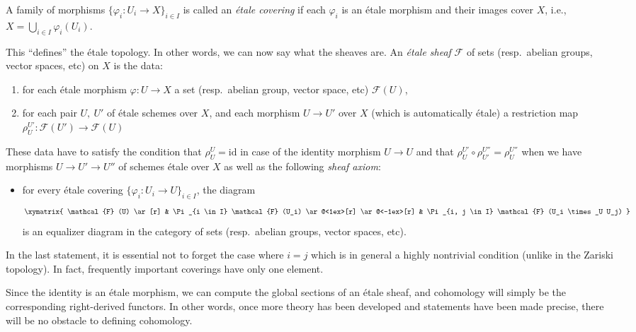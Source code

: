\begin{definition}
\label{definition-etale-covering-initial}
A family of morphisms $\{ \varphi_i : U_i \to X\}_{i \in I}$ is
called an {\it \'etale covering} if each $\varphi_i$ is an \'etale morphism
and their images cover $X$, i.e.,
$X = \bigcup_{i \in I} \varphi_i(U_i)$.
\end{definition}

\noindent
This ``defines'' the \'etale topology. In other words, we can now say what the
sheaves are. An {\it \'etale sheaf} $\mathcal{F}$ of sets
(resp.\ abelian groups, vector spaces, etc) on $X$ is the data:
\begin{enumerate}
\item for each \'etale morphism $\varphi : U \to X$ a set
(resp.\ abelian group, vector space, etc) $\mathcal{F}(U)$,
\item for each pair $U, \ U'$ of \'etale schemes over $X$,
and each morphism $U \to U'$ over $X$ (which is
automatically \'etale) a restriction map
$\rho^{U'}_U : \mathcal{F}(U') \to \mathcal{F}(U)$
\end{enumerate}
These data have to satisfy the condition that $\rho^U_U = \text{id}$
in case of the identity morphism $U \to U$
and that $\rho^{U'}_U \circ \rho^{U''}_{U'} = \rho^{U''}_U$
when we have morphisms $U \to U' \to U''$ of schemes \'etale over $X$
as well as the following {\it sheaf axiom}:
\begin{itemize}
\item[(*)] for every \'etale covering $\{ \varphi_i : U_i \to U\}_{i \in
I}$, the diagram
$$
\xymatrix{
\mathcal{F} (U) \ar[r] &
\Pi_{i \in I} \mathcal{F} (U_i) \ar@<1ex>[r] \ar@<-1ex>[r] &
\Pi_{i, j \in I} \mathcal{F} (U_i \times_U U_j)
}
$$
is an equalizer diagram in the category of sets
(resp.\ abelian groups, vector spaces, etc).
\end{itemize}

\begin{remark}
\label{remark-i-is-j}
In the last statement, it is essential not to forget the case where $i = j$
which is in general a highly nontrivial condition (unlike in the Zariski
topology). In fact, frequently important coverings have only one element.
\end{remark}

\noindent
Since the identity is an \'etale morphism, we can compute the global sections
of an \'etale sheaf, and cohomology will simply be the corresponding
right-derived functors. In other words, once more theory has been developed and
statements have been made precise, there will be no obstacle to defining
cohomology.




